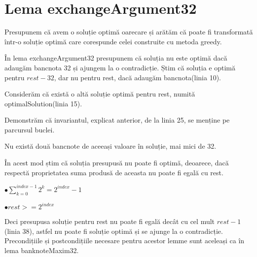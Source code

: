 \section{Lema exchangeArgument32}

Presupunem că avem o soluție optimă oarecare și arătăm că poate fi transformată într-o soluție optimă care corespunde 
celei construite cu metoda greedy.\par
În lema exchangeArgument32 presupunem că soluția nu este optimă dacă adaugăm bancnota 32 și ajungem la o contradicție.
Știm că soluția e optimă pentru $rest - 32$, dar nu pentru rest, dacă adaugăm bancnota(linia 10).\par
Considerăm că există o altă soluție optimă pentru rest, numită optimalSolution(linia 15).\par
Demonstrăm că invariantul, explicat anterior, de la linia 25, se menține pe parcursul buclei.\par
Nu există două bancnote de aceeași valoare în soluție, mai mici de 32.\par
În acest mod știm că soluția presupusă nu poate fi optimă, deoarece, dacă respectă proprietatea
suma produsă de aceasta nu poate fi egală cu rest. \par
$\bullet \sum_{k=0}^{index-1} 2^{k} = 2^{index}-1 $\par
$\bullet rest > = 2^{index} $ \par
Deci presupusa soluție pentru rest nu poate fi egală decât cu cel mult $rest- 1$(linia 38), astfel nu poate fi soluție optimă și se ajunge la o contradicție. 
Precondițiile și postcondițiile necesare pentru acestor lemme sunt aceleași ca în lema banknoteMaxim32.\par

